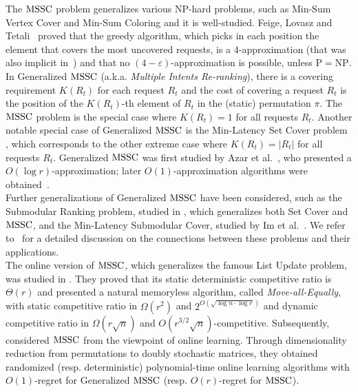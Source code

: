 %
The $\mathrm{MSSC}$ problem generalizes various $\mathrm{NP}$-hard problems, such as Min-Sum Vertex Cover and Min-Sum Coloring and it is well-studied. Feige, Lovasz and Tetali~\cite{FLT04} proved that the greedy algorithm, which picks in each position the element that covers the most uncovered requests, is a $4$-approximation (that was also implicit in~\cite{BBHST98}) and that no $(4-\varepsilon)$-approximation is possible, unless $\mathrm{P} = \mathrm{NP}$. In Generalized $\mathrm{MSSC}$ (a.k.a. \emph{Multiple Intents Re-ranking}), there is a covering requirement $K(R_t)$ for each request $R_t$ and the cost of covering a request $R_t$ is the position of the $K(R_t)$-th element of $R_t$ in the (static) permutation $\pi$. The $\mathrm{MSSC}$ problem is the special case where $K(R_t)=1$ for all requests $R_t$. Another notable special case of Generalized $\mathrm{MSSC}$ is the Min-Latency Set Cover problem \cite{HL05}, which corresponds to the other extreme case where $K(R_t) = |R_t|$ for all requests $R_t$. Generalized $\mathrm{MSSC}$ was first studied by Azar et al.~\cite{AGY09}, who presented a $O(\log r)$-approximation; later $O(1)$-approximation algorithms were obtained~\cite{BGK10,SW11,ISZ14,BBFT20}. \\

Further generalizations of Generalized $\mathrm{MSSC}$ have been considered, such as the Submodular Ranking problem, studied in \cite{AG11}, which generalizes both Set Cover and $\mathrm{MSSC}$, and the Min-Latency Submodular Cover, studied by Im et al.~\cite{INZ16}. We refer to~\cite{INZ16,Im16} for a detailed discussion on the connections between these problems and their applications. \\ 

The online version of $\mathrm{MSSC}$, which generalizes the famous List Update problem, was studied in \cite{FKKSV20}. They proved that its static deterministic competitive ratio is $\Theta(r)$ and presented a natural  memoryless algorithm, called \emph{Move-all-Equally}, with static competitive ratio in $\Omega(r^2)$ and $2^{O(\sqrt{\log n  \cdot \log r})}$ and dynamic competitive ratio in $\Omega(r \sqrt{n})$ and $O(r^{3/2} \sqrt{n})$-competitive. Subsequently, \cite{FLPS20} considered $\mathrm{MSSC}$ from the viewpoint of online learning. Through dimensionality reduction from permutations to doubly stochastic matrices, they obtained randomized (resp. deterministic) polynomial-time online learning algorithms with $O(1)$-regret for Generalized $\mathrm{MSSC}$ (resp. $O(r)$-regret for $\mathrm{MSSC}$).







